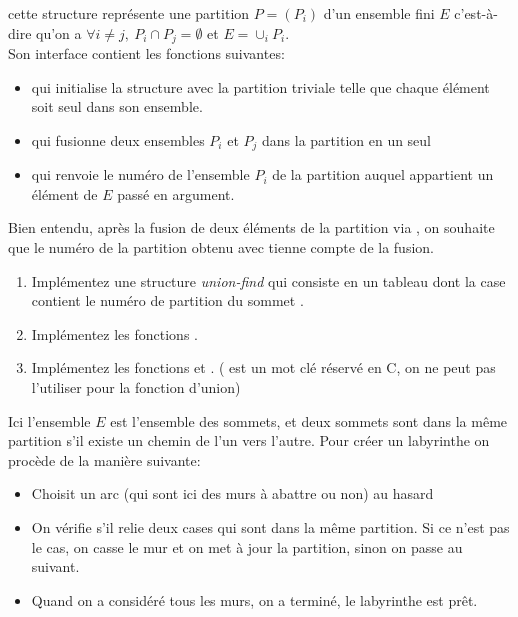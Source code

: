 \documentclass[a4paper, 10pt]{article}
\begin{document}
cette structure représente une partition \(P=(P_i)\)  d'un ensemble fini \(E\) c'est-à-dire qu'on a \(\forall i\neq j,~P_i\cap P_j = \emptyset\) et \(E=\cup_i P_i\).\\
Son interface contient les fonctions suivantes:
\begin{itemize}
\item {} qui initialise la structure avec la partition triviale telle que chaque élément soit seul dans son ensemble.
\item {} qui fusionne deux ensembles \(P_i\) et \(P_j\) dans la partition en un seul
\item {} qui renvoie le numéro de l'ensemble \(P_i\) de la partition auquel appartient un élément de \(E\) passé en argument.
\end{itemize}
Bien entendu, après la fusion de deux éléments de la partition via , on souhaite que le numéro de la partition obtenu avec  tienne compte de la fusion.
\smallbreak
\begin{enumerate}[resume]
\item Implémentez une structure \emph{union-find} qui consiste en un tableau dont la case  contient le numéro de partition du sommet .
\item Implémentez les fonctions .
\item Implémentez les fonctions  et . ( est un mot clé réservé en C, on ne peut pas l'utiliser pour la fonction d'union)
\end{enumerate}
Ici l'ensemble \(E\) est l'ensemble des sommets, et deux sommets sont dans la même partition s'il existe un chemin de l'un vers l'autre. Pour créer un labyrinthe on procède de la manière suivante:
\begin{itemize}
\item Choisit un arc (qui sont ici des murs à abattre ou non) au hasard
\item On vérifie s'il relie deux cases qui sont dans la même partition. Si ce n'est pas le cas, on casse le mur et on met à jour la partition, sinon on passe au suivant.
\item Quand on a considéré tous les murs, on a terminé, le labyrinthe est prêt.
\end{itemize}
\end{document}
